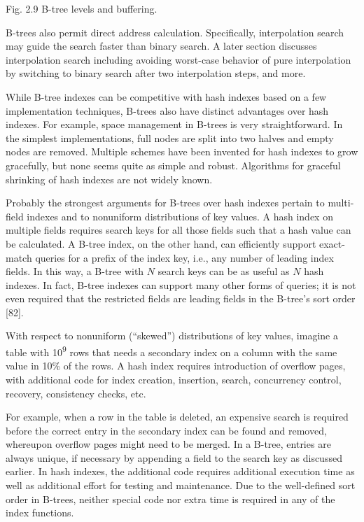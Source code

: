 Fig. 2.9 B-tree levels and buffering.

B-trees also permit direct address calculation. Specifically,
interpolation search may guide the search faster than binary search. A
later section discusses interpolation search including avoiding
worst-case behavior of pure interpolation by switching to binary search
after two interpolation steps, and more.

While B-tree indexes can be competitive with hash indexes based on a few
implementation techniques, B-trees also have distinct advantages over
hash indexes. For example, space management in B-trees is very
straightforward. In the simplest implementations, full nodes are split
into two halves and empty nodes are removed. Multiple schemes have been
invented for hash indexes to grow gracefully, but none seems quite as
simple and robust. Algorithms for graceful shrinking of hash indexes are
not widely known.

Probably the strongest arguments for B-trees over hash indexes pertain
to multi-field indexes and to nonuniform distributions of key values. A
hash index on multiple fields requires search keys for all those fields
such that a hash value can be calculated. A B-tree index, on the other
hand, can efficiently support exact-match queries for a prefix of the
index key, i.e., any number of leading index fields. In this way, a
B-tree with $N$ search keys can be as useful as $N$ hash
indexes. In fact, B-tree indexes can support many other forms of
queries; it is not even required that the restricted fields are leading
fields in the B-tree's sort order {[}82{]}.

With respect to nonuniform (``skewed'') distributions of key values,
imagine a table with 10\textsuperscript{9} rows that needs a secondary
index on a column with the same value in 10\% of the rows. A hash index
requires introduction of overflow pages, with additional code for index
creation, insertion, search, concurrency control, recovery, consistency
checks, etc.

For example, when a row in the table is deleted, an expensive search is
required before the correct entry in the secondary index can be found
and removed, whereupon overflow pages might need to be merged. In a
B-tree, entries are always unique, if necessary by appending a field to
the search key as discussed earlier. In hash indexes, the additional
code requires additional execution time as well as additional effort for
testing and maintenance. Due to the well-defined sort order in B-trees,
neither special code nor extra time is required in any of the index
functions.

